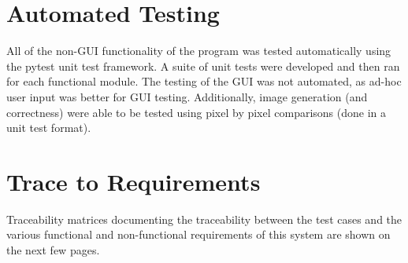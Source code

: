 \documentclass[12pt, titlepage]{article}
\begin{document}
\section{Automated Testing}
All of the non-GUI functionality of the program was tested automatically using
the pytest unit test framework. A suite of unit tests were developed and then
ran for each functional module. The testing of the GUI was not automated, as
ad-hoc user input was better for GUI testing. Additionally, image generation
(and correctness) were able to be tested using pixel by pixel comparisons
(done in a unit test format).

\section{Trace to Requirements}
Traceability matrices documenting the traceability between the test cases and
the various functional and non-functional requirements of this system are
shown on the next few pages.
\end{document}
